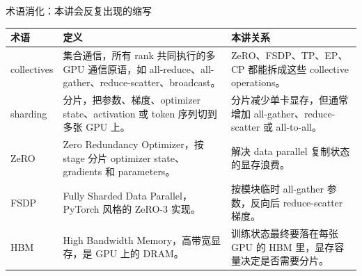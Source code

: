 \begin{knowledgebox}{术语消化：本讲会反复出现的缩写}
\begin{tabular}{L{0.15\textwidth}L{0.33\textwidth}L{0.38\textwidth}}
\toprule
术语 & 定义 & 本讲关系 \\
\midrule
collectives & 集合通信，所有 rank 共同执行的多 GPU 通信原语，如 all-reduce、all-gather、reduce-scatter、broadcast。 & ZeRO、FSDP、TP、EP、CP 都能拆成这些 collective operations。 \\
sharding & 分片，把参数、梯度、optimizer state、activation 或 token 序列切到多张 GPU 上。 & 分片减少单卡显存，但通常增加 all-gather、reduce-scatter 或 all-to-all。 \\
ZeRO & Zero Redundancy Optimizer，按 stage 分片 optimizer state、gradients 和 parameters。 & 解决 data parallel 复制状态的显存浪费。 \\
FSDP & Fully Sharded Data Parallel，PyTorch 风格的 ZeRO-3 实现。 & 按模块临时 all-gather 参数，反向后 reduce-scatter 梯度。 \\
HBM & High Bandwidth Memory，高带宽显存，是 GPU 上的 DRAM。 & 训练状态最终要落在每张 GPU 的 HBM 里，显存容量决定是否需要分片。 \\
\bottomrule
\end{tabular}
\end{knowledgebox}

